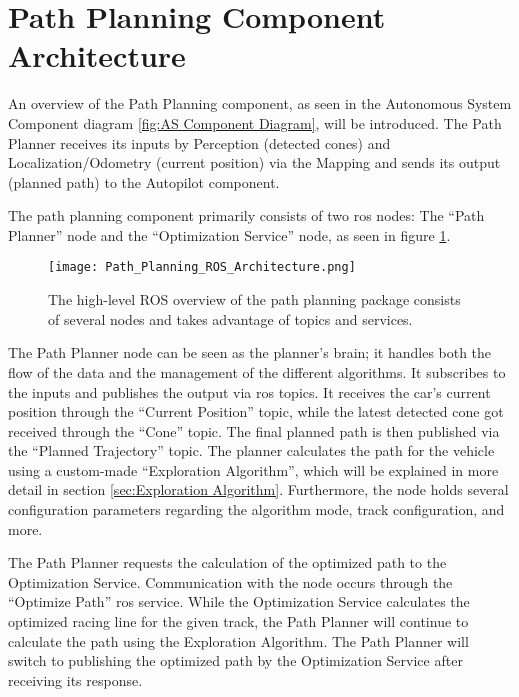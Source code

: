 \section{Path Planning Component Architecture} \label{sec:Path Planning Component Architecture}
An overview of the Path Planning component, as seen in the Autonomous System Component diagram \ref{fig:AS Component Diagram}, will be introduced. The Path Planner receives its inputs by Perception (detected cones) and Localization/Odometry (current position) via the Mapping and sends its output (planned path) to the Autopilot component.

The path planning component primarily consists of two \acrshort{ros} nodes: The ``Path Planner'' node and the ``Optimization Service'' node, as seen in figure \ref{fig:Path Planning ROS Architecture}.

\begin{figure}[H]
    \centering
    \texttt{[image: Path\_Planning\_ROS\_Architecture.png]}
    \caption{The high-level ROS overview of the path planning package consists of several nodes and takes advantage of topics and services.}
    \label{fig:Path Planning ROS Architecture}
\end{figure}

The Path Planner node can be seen as the planner's brain; it handles both the flow of the data and the management of the different algorithms. It subscribes to the inputs and publishes the output via \acrshort{ros} topics. It receives the car's current position through the ``Current Position'' topic, while the latest detected cone got received through the ``Cone'' topic. The final planned path is then published via the ``Planned Trajectory'' topic. The planner calculates the path for the vehicle using a custom-made ``Exploration Algorithm'', which will be explained in more detail in section \ref{sec:Exploration Algorithm}. Furthermore, the node holds several configuration parameters regarding the algorithm mode, track configuration, and more.

The Path Planner requests the calculation of the optimized path to the Optimization Service. Communication with the node occurs through the ``Optimize Path'' \acrshort{ros} service. While the Optimization Service calculates the optimized racing line for the given track, the Path Planner will continue to calculate the path using the Exploration Algorithm. The Path Planner will switch to publishing the optimized path by the Optimization Service after receiving its response.

